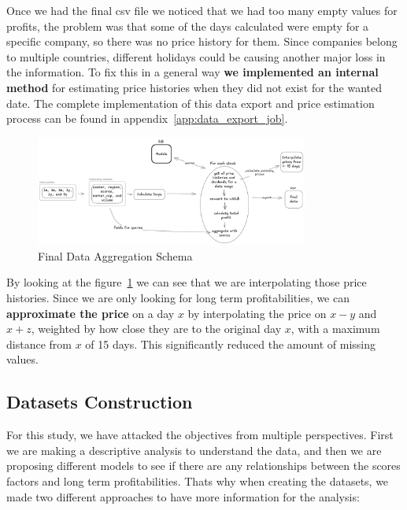 \documentclass[11pt,english,a4paper,hidelinks]{book}
\begin{document}
\noindent Once we had the final csv file we noticed that we had too many empty values for profits, the problem was that some of the days calculated were empty for a specific company, so there was no price history for them. Since companies belong to multiple countries, different holidays could be causing another major loss in the information. To fix this in a general way \textbf{we implemented an internal method} for estimating price histories when they did not exist for the wanted date. The complete implementation of this data export and price estimation process can be found in appendix~\ref{app:data_export_job}.

\begin{figure}[H]
    \centering
    \includegraphics[width=0.8\textwidth]{images/tweenvest/Final Data Aggregation Schema.png}
    \caption{Final Data Aggregation Schema}
    \label{fig:final_data_aggregation_schema}
\end{figure}

\noindent By looking at the figure~\ref{fig:final_data_aggregation_schema} we can see that we are interpolating those price histories. Since we are only looking for long term profitabilities, we can \textbf{approximate the price} on a day $x$ by interpolating the price on $x-y$ and $x+z$, weighted by how close they are to the original day $x$, with a maximum distance from $x$ of 15 days. This significantly reduced the amount of missing values.

\subsection{Datasets Construction}

For this study, we have attacked the objectives from multiple perspectives. First we are making a descriptive analysis to understand the data, and then we are proposing different models to see if there are any relationships between the scores factors and long term profitabilities. Thats why when creating the datasets, we made two different approaches to have more information for the analysis:
\end{document}

